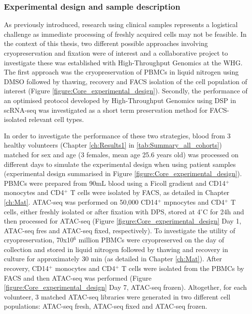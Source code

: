 \subsubsection{Experimental design and sample description}
As previously introduced, research using clinical samples represents a logistical challenge as immediate processing of freshly acquired cells may not be feasible. In the context of this thesis, two different possible approaches involving cryopreservation and fixation were of interest and a collaborative project to investigate these was established with High-Throughput Genomics at the WHG. The first approach was the cryopreservation of PBMCs in liquid nitrogen using DMSO followed by thawing, recovery and FACS isolation of the cell population of interest (Figure \ref{figure:Core_experimental_design}). Secondly, the performance of an optimised protocol developed by High-Throughput Genomics using DSP in scRNA-seq \parencite{Attar2018} was investigated as a short term preservation method for FACS-isolated relevant cell types.

In order to investigate the performance of these two strategies, blood from 3 healthy volunteers (Chapter \ref{ch:Results1} in \ref{tab:Summary_all_cohorts}) matched for sex and age (3 females, mean age 25.6 years old) was processed on different days to simulate the experimental design when using patient samples (experimental design summarised in Figure \ref{figure:Core_experimental_design}). PBMCs were prepared from 90mL blood using a Ficoll gradient and CD14$^+$ monocytes and CD4$^+$ T cells were isolated by FACS, as detailed in Chapter \ref{ch:Mat}. ATAC-seq was performed on 50,000 CD14$^+$ mpnocytes and CD4$^+$ T cells, either freshly isolated or after fixation with DPS, stored at 4{$^\circ$}C for 24h and then processed for ATAC-seq (Figure \ref{figure:Core_experimental_design} Day 1, ATAC-seq fres and ATAC-seq fixed, respectively). To investigate the utility of cryopreservation, 70x10$^6$ million PBMCs were cryopreserved on the day of collection and stored in liquid nitrogen followed by thawing and recovery in culture for approximately 30 min (as detailed in Chapter \ref{ch:Mat}). After recovery, CD14$^+$ monocytes and CD4$^+$ T cells were isolated from the PBMCs by FACS and then ATAC-seq was performed (Figure \ref{figure:Core_experimental_design} Day 7, ATAC-seq frozen). Altogether, for each volunteer, 3 matched ATAC-seq libraries were generated in two different cell populations: ATAC-seq fresh, ATAC-seq fixed and ATAC-seq frozen.

